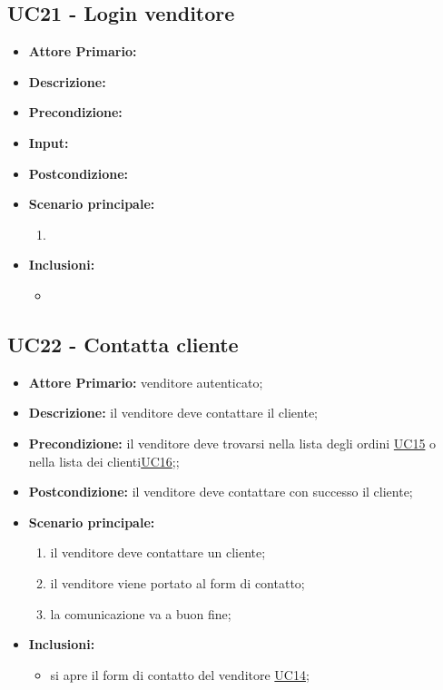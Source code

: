 \subsection{UC21 - Login venditore}
\begin{itemize}
    \item \textbf{Attore Primario:} 
    \item \textbf{Descrizione:}
    \item \textbf{Precondizione:}
    \item \textbf{Input:}
    \item \textbf{Postcondizione:}
    \item \textbf{Scenario principale:}
    \begin{enumerate}
        \item 
    \end{enumerate}
    \item \textbf{Inclusioni:}
    \begin{itemize}
        \item
    \end{itemize}
\end{itemize}

\subsection{UC22 - Contatta cliente}
\label{UC22}
\begin{itemize}
    \item \textbf{Attore Primario:} venditore autenticato;
    \item \textbf{Descrizione:} il venditore deve contattare il cliente;
    \item \textbf{Precondizione:} il venditore deve trovarsi nella lista degli ordini \hyperref[UC15]{UC15} o nella lista dei clienti\hyperref[UC16]{UC16};;
    \item \textbf{Postcondizione:} il venditore deve contattare con successo il cliente;
    \item \textbf{Scenario principale:}
    \begin{enumerate}
        \item il venditore deve contattare un cliente;
        \item il venditore viene portato al form di contatto;
        \item la comunicazione va a buon fine;
    \end{enumerate}
    \item \textbf{Inclusioni:}
    \begin{itemize}
        \item si apre il form di contatto del venditore \hyperref[UC14]{UC14};
    \end{itemize}
\end{itemize}